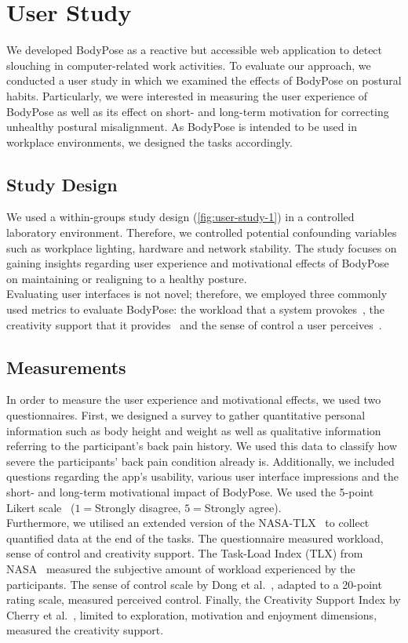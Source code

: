 \section{User Study} %
\label{user-study-1}
We developed BodyPose as a reactive but accessible web application to detect slouching in computer-related work activities. To evaluate our approach, we conducted a user study in which we examined the effects of BodyPose on postural habits. Particularly, we were interested in measuring the user experience of BodyPose as well as its effect on short- and long-term motivation for correcting unhealthy postural misalignment. As BodyPose is intended to be used in workplace environments, we designed the tasks accordingly.

\subsection{Study Design}
\label{us1-study-design}
We used a within-groups study design (\autoref{fig:user-study-1}) in a controlled laboratory environment. Therefore, we controlled potential confounding variables such as workplace lighting, hardware and network stability.
The study focuses on gaining insights regarding user experience and motivational effects of BodyPose on maintaining or realigning to a healthy posture.\\
Evaluating user interfaces is not novel; therefore, we employed three commonly used metrics to evaluate BodyPose: the workload that a system provokes~\cite{hart1988development,hart2006nasa}, the creativity support that it provides~\cite{cherry2014quantifying} and the sense of control a user perceives~\cite{dong2015development}.

\subsection{Measurements}
\label{us1-measurements}
In order to measure the user experience and motivational effects, we used two questionnaires.
First, we designed a survey to gather quantitative personal information such as body height and weight as well as qualitative information referring to the participant's back pain history. We used this data to classify how severe the participants' back pain condition already is. Additionally, we included questions regarding the app's usability, various user interface impressions and the short- and long-term motivational impact of BodyPose. We used the 5-point Likert scale~\cite{likert1932technique} ($1=$Strongly disagree, $5=$Strongly agree).\\
Furthermore, we utilised an extended version of the NASA-TLX~\cite{hart2006nasa} to collect quantified data at the end of the tasks. The questionnaire measured workload, sense of control and creativity support. The Task-Load Index (TLX) from NASA~\cite{hart2006nasa} measured the subjective amount of workload experienced by the participants. The sense of control scale by Dong et al.~\cite{dong2015development}, adapted to a 20-point rating scale, measured perceived control. Finally, the Creativity Support Index by Cherry et al.~\cite{cherry2014quantifying}, limited to exploration, motivation and enjoyment dimensions, measured the creativity support.

